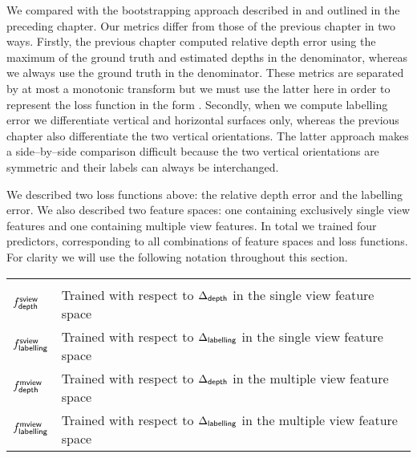 
We compared with the bootstrapping approach described in
\cite{Flint11} and outlined in the preceding chapter. Our metrics
differ from those of the previous chapter in two ways. Firstly, the
previous chapter computed relative depth error using the maximum of
the ground truth and estimated depths in the denominator, whereas we
always use the ground truth in the denominator. These metrics are
separated by at most a monotonic transform but we must use the latter
here in order to represent the loss function in the form
. Secondly, when we compute labelling error
we differentiate vertical and horizontal surfaces only, whereas the
previous chapter also differentiate the two vertical orientations. The
latter approach makes a side--by--side comparison difficult because
the two vertical orientations are symmetric and their labels can
always be interchanged.

We described two loss functions above: the relative depth error and
the labelling error. We also described two feature spaces: one
containing exclusively single view features and one containing
multiple view features. In total we trained four predictors,
corresponding to all combinations of feature spaces and loss
functions. For clarity we will use the following notation throughout
this section.

\begin{tabular}{p{20mm}l}
  &\\
  $\Fsviewdepth$ & Trained with respect to
  $\DepthLoss$ in the single view feature space \vspace{2mm} \\
  $\Fsviewlbl$ & Trained with respect to
  $\LblLoss$ in the single view feature space \vspace{2mm} \\
  $\Fmviewdepth$ & Trained with respect to
  $\DepthLoss$ in the multiple view feature space \vspace{2mm} \\
  $\Fmviewlbl$ & Trained with respect to
  $\LblLoss$ in the multiple view feature space \vspace{2mm} 
\end{tabular}

